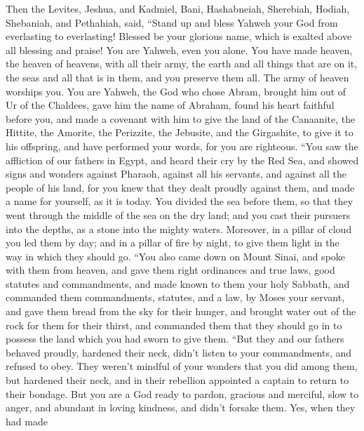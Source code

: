  Then the Levites, Jeshua, and Kadmiel, Bani, Hashabneiah,
Sherebiah, Hodiah, Shebaniah, and Pethahiah, said, ``Stand up and bless
Yahweh your God from everlasting to everlasting! Blessed be your
glorious name, which is exalted above all blessing and praise!
 You are Yahweh, even you alone. You have made heaven, the
heaven of heavens, with all their army, the earth and all things that
are on it, the seas and all that is in them, and you preserve them all.
The army of heaven worships you.  You are Yahweh, the God
who chose Abram, brought him out of Ur of the Chaldees, gave him the
name of Abraham,  found his heart faithful before you, and
made a covenant with him to give the land of the Canaanite, the Hittite,
the Amorite, the Perizzite, the Jebusite, and the Girgashite, to give it
to his offspring, and have performed your words, for you are righteous.
 ``You saw the affliction of our fathers in Egypt, and
heard their cry by the Red Sea,  and showed signs and
wonders against Pharaoh, against all his servants, and against all the
people of his land, for you knew that they dealt proudly against them,
and made a name for yourself, as it is today.  You
divided the sea before them, so that they went through the middle of the
sea on the dry land; and you cast their pursuers into the depths, as a
stone into the mighty waters.  Moreover, in a pillar of
cloud you led them by day; and in a pillar of fire by night, to give
them light in the way in which they should go.  ``You
also came down on Mount Sinai, and spoke with them from heaven, and gave
them right ordinances and true laws, good statutes and commandments,
 and made known to them your holy Sabbath, and commanded
them commandments, statutes, and a law, by Moses your servant,
 and gave them bread from the sky for their hunger, and
brought water out of the rock for them for their thirst, and commanded
them that they should go in to possess the land which you had sworn to
give them.  ``But they and our fathers behaved proudly,
hardened their neck, didn't listen to your commandments, 
and refused to obey. They weren't mindful of your wonders that you did
among them, but hardened their neck, and in their rebellion appointed a
captain to return to their bondage. But you are a God ready to pardon,
gracious and merciful, slow to anger, and abundant in loving kindness,
and didn't forsake them.  Yes, when they had made
